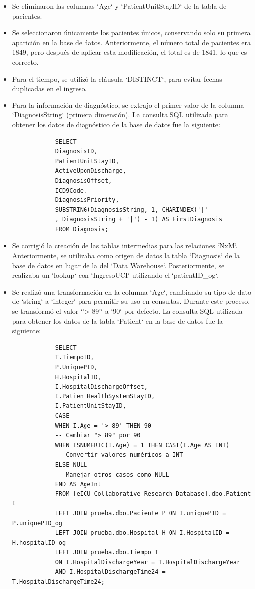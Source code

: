 \documentclass[12pt, a4paper, twoside]{article}
\begin{document}
	\begin{itemize}
		\item Se eliminaron las columnas `Age` y `PatientUnitStayID` de la tabla de pacientes.
		\item Se seleccionaron únicamente los pacientes únicos, conservando solo su primera aparición en la base de datos. Anteriormente, el número total de pacientes era 1849, pero después de aplicar esta modificación, el total es de 1841, lo que es correcto.
		\item Para el tiempo, se utilizó la cláusula `DISTINCT`, para evitar fechas duplicadas en el ingreso.
		\item Para la información de diagnóstico, se extrajo el primer valor de la columna `DiagnosisString` (primera dimensión). La consulta SQL utilizada para obtener los datos de diagnóstico de la base de datos fue la siguiente:
		\begin{verbatim}
			SELECT 
			DiagnosisID,
			PatientUnitStayID,
			ActiveUponDischarge,
			DiagnosisOffset,
			ICD9Code,
			DiagnosisPriority,
			SUBSTRING(DiagnosisString, 1, CHARINDEX('|'
			, DiagnosisString + '|') - 1) AS FirstDiagnosis
			FROM Diagnosis;
		\end{verbatim}
		\item Se corrigió la creación de las tablas intermedias para las relaciones `NxM`. Anteriormente, se utilizaba como origen de datos la tabla `Diagnosis` de la base de datos en lugar de la del `Data Warehouse`. Posteriormente, se realizaba un `lookup` con `IngresoUCI` utilizando el `patientID\_og`.
		\item Se realizó una transformación en la columna `Age`, cambiando su tipo de dato de `string` a `integer` para permitir su uso en consultas. Durante este proceso, se transformó el valor `'> 89'` a `90` por defecto. La consulta SQL utilizada para obtener los datos de la tabla `Patient` en la base de datos fue la siguiente:
		\begin{verbatim}
			SELECT 
			T.TiempoID,
			P.UniquePID,
			H.HospitalID,
			I.HospitalDischargeOffset,
			I.PatientHealthSystemStayID,
			I.PatientUnitStayID,
			CASE 
			WHEN I.Age = '> 89' THEN 90                      
			-- Cambiar "> 89" por 90
			WHEN ISNUMERIC(I.Age) = 1 THEN CAST(I.Age AS INT) 
			-- Convertir valores numéricos a INT
			ELSE NULL                                       
			-- Manejar otros casos como NULL
			END AS AgeInt
			FROM [eICU Collaborative Research Database].dbo.Patient I
			LEFT JOIN prueba.dbo.Paciente P ON I.uniquePID = P.uniquePID_og
			LEFT JOIN prueba.dbo.Hospital H ON I.HospitalID = H.hospitalID_og
			LEFT JOIN prueba.dbo.Tiempo T 
			ON I.HospitalDischargeYear = T.HospitalDischargeYear 
			AND I.HospitalDischargeTime24 = T.HospitalDischargeTime24;
		\end{verbatim}
	\end{itemize}
		
\end{document}
